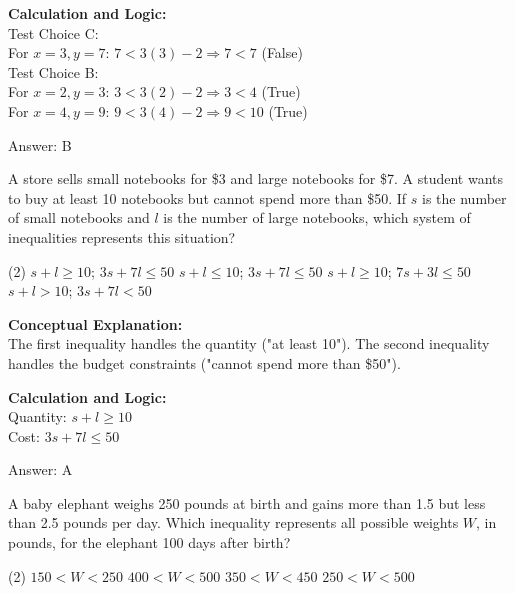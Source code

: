 \documentclass[11pt,paper=a4,answers]{exam}
\begin{document}
\begin{questions}
\begin{solution}
\vspace{10pt}
\textbf{Calculation and Logic:} \\
Test Choice C: \\
For $x=3, y=7$: $7 < 3(3) - 2 \Rightarrow 7 < 7$ (False) \\
Test Choice B: \\
For $x=2, y=3$: $3 < 3(2) - 2 \Rightarrow 3 < 4$ (True) \\
For $x=4, y=9$: $9 < 3(4) - 2 \Rightarrow 9 < 10$ (True)

\vspace{15pt}
Answer: \colorbox{yellow!100}{B}
\end{solution}

\vspace{20pt}

\question
A store sells small notebooks for \$3 and large notebooks for \$7. A student wants to buy at least 10 notebooks but cannot spend more than \$50. If $s$ is the number of small notebooks and $l$ is the number of large notebooks, which system of inequalities represents this situation?
\begin{tasks}(2)
    \task $s + l \ge 10$; $3s + 7l \le 50$
    \task $s + l \le 10$; $3s + 7l \le 50$
    \task $s + l \ge 10$; $7s + 3l \le 50$
    \task $s + l > 10$; $3s + 7l < 50$
\end{tasks}

\begin{solution}
\textbf{Conceptual Explanation:} \\
The first inequality handles the quantity ("at least 10"). The second inequality handles the budget constraints ("cannot spend more than \$50").

\vspace{10pt}
\textbf{Calculation and Logic:} \\
Quantity: $s + l \ge 10$ \\
Cost: $3s + 7l \le 50$

\vspace{15pt}
Answer: \colorbox{yellow!100}{A}
\end{solution}

\vspace{20pt}

\question
A baby elephant weighs 250 pounds at birth and gains more than 1.5 but less than 2.5 pounds per day. Which inequality represents all possible weights $W$, in pounds, for the elephant 100 days after birth?
\begin{tasks}(2)
    \task $150 < W < 250$
    \task $400 < W < 500$
    \task $350 < W < 450$
    \task $250 < W < 500$
\end{tasks}


\end{questions}
\end{document}
